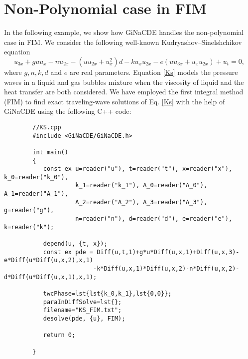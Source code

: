 \documentclass[prd,aps,floats,showkeys,nofootinbib,notitlepage]{revtex4-2}
\begin{document}
	\section{Non-Polynomial case in FIM}
	In the following example, we show how GiNaCDE handles the non-polynomial case in FIM. We consider the following well-known Kudryashov–Sinelshchikov equation \cite{ks} %
	\begin{equation}\label{Ks}
		{u_{3x}} + gu{u_x} - n{u_{2x}} - \left( {u{u_{2x}} + u_x^2} \right)d - k{u_x}{u_{2x}} - e\left( {u{u_{3x}} + {u_x}{u_{2x}}} \right) + {u_t}=0,
	\end{equation}
	where $g,n,k,d$ and $e$ are real parameters. Equation \eqref{Ks} models the pressure waves in a liquid and gas bubbles mixture when the viscosity of liquid and the heat transfer are both considered. We have employed the first integral method (FIM) to find exact traveling-wave solutions of Eq. \eqref{Ks} with the help of GiNaCDE using the following C++ code:
	\begin{verbatim}
		//KS.cpp
		#include <GiNaCDE/GiNaCDE.h>
				
		int main()
		{
		   const ex u=reader("u"), t=reader("t"), x=reader("x"), k_0=reader("k_0"), 
		            k_1=reader("k_1"), A_0=reader("A_0"), A_1=reader("A_1"), 
		            A_2=reader("A_2"), A_3=reader("A_3"), g=reader("g"), 
		            n=reader("n"), d=reader("d"), e=reader("e"), k=reader("k");
		            
		   depend(u, {t, x});
		   const ex pde = Diff(u,t,1)+g*u*Diff(u,x,1)+Diff(u,x,3)-e*Diff(u*Diff(u,x,2),x,1)
		                 -k*Diff(u,x,1)*Diff(u,x,2)-n*Diff(u,x,2)-d*Diff(u*Diff(u,x,1),x,1);
				
		   twcPhase=lst{lst{k_0,k_1},lst{0,0}};
		   paraInDiffSolve=lst{};
		   filename="KS_FIM.txt";
		   desolve(pde, {u}, FIM);
		   		
		   return 0;
			
		}
	
	\end{verbatim}
	
\end{document}
